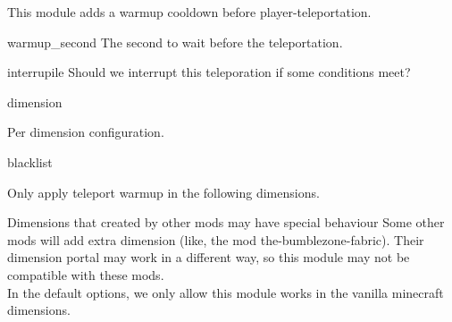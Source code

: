 \label{ch:teleport_warmup}

This module adds a warmup cooldown before player-teleportation.

\begin{Configuration}
    \item[warmup\_second]{
        The second to wait before the teleportation.
    }

    \item[interrupile]{
        Should we interrupt this teleporation if some conditions meet?
    }

    \item[dimension]{
        Per dimension configuration.

        \begin{NestedList}
            \item[blacklist] {
                Only apply teleport warmup in the following dimensions.

                \begin{warn}{Dimensions that created by other mods may have special behaviour}
                    Some other mods will add extra dimension (like, the mod the-bumblezone-fabric).
                    Their dimension portal may work in a different way, so this module may not be compatible with these mods.\\
                    In the default options, we only allow this module works in the vanilla minecraft dimensions.
                \end{warn}
            }
        \end{NestedList}
    }
\end{Configuration}

